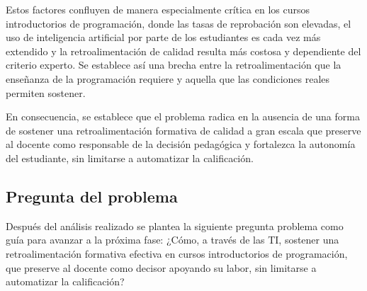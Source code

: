 \documentclass[letterpaper, 10 pt, conference]{ieeeconf}
\begin{document}
Estos factores confluyen de manera especialmente crítica en los cursos introductorios de programación, donde las tasas de reprobación son elevadas, el uso de inteligencia artificial por parte de los estudiantes es cada vez más extendido y la retroalimentación de calidad resulta más costosa y dependiente del criterio experto. Se establece así una brecha entre la retroalimentación que la enseñanza de la programación requiere y aquella que las condiciones reales permiten sostener.

En consecuencia, se establece que el problema radica en la ausencia de una forma de sostener una retroalimentación formativa de calidad a gran escala que preserve al docente como responsable de la decisión pedagógica y fortalezca la autonomía del estudiante, sin limitarse a automatizar la calificación. 


\subsection{Pregunta del problema} 

Después del análisis realizado se plantea la siguiente pregunta problema como guía para avanzar a la próxima fase: ¿Cómo, a través de las TI, sostener una retroalimentación formativa efectiva en cursos introductorios de programación, que preserve al docente como decisor apoyando su labor, sin limitarse a automatizar la calificación?



\addtolength{\textheight}{-12cm}   %







\end{document}
